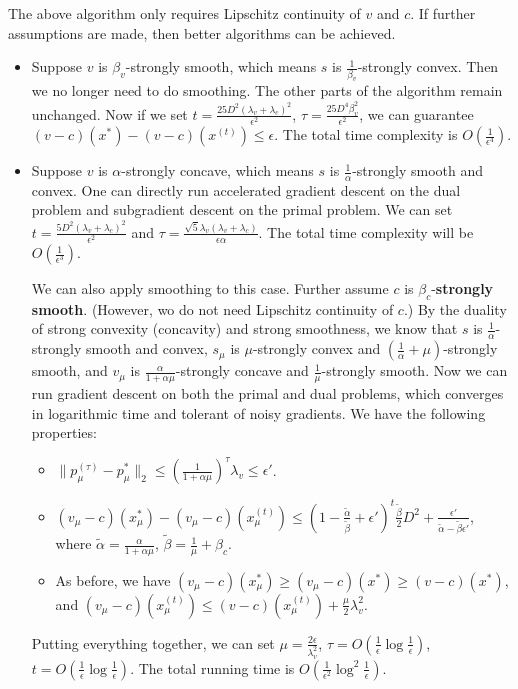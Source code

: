\documentclass{article}
\begin{document}
The above algorithm only requires Lipschitz continuity of $v$ and $c$. If further assumptions are made, then better algorithms can be achieved.
\begin{itemize}
    \item Suppose $v$ is $\beta_v$-strongly smooth, which means $s$ is $\frac{1}{\beta_v}$-strongly convex. Then we no longer need to do smoothing. The other parts of the algorithm remain unchanged. Now if we set $t=\frac{25D^2(\lambda_v+\lambda_c)^2}{\epsilon^2}$, $\tau=\frac{25D^4\beta_v^2}{\epsilon^2}$, we can guarantee $(v-c)(x^*)-(v-c)(x^{(t)})\le\epsilon$. The total time complexity is $O\left(\frac{1}{\epsilon^4}\right)$.
    \item Suppose $v$ is $\alpha$-strongly concave, which means $s$ is $\frac{1}{\alpha}$-strongly smooth and convex. One can directly run accelerated gradient descent on the dual problem and subgradient descent on the primal problem. We can set $t=\frac{5D^2(\lambda_v+\lambda_c)^2}{\epsilon^2}$ and $\tau=\frac{\sqrt{5}\lambda_v(\lambda_v+\lambda_c)}{\epsilon\alpha}$. The total time complexity will be $O\left(\frac{1}{\epsilon^3}\right)$.

    We can also apply smoothing to this case. Further assume $c$ is $\beta_c$-\textbf{strongly smooth}. (However, wo do not need Lipschitz continuity of $c$.) By the duality of strong convexity (concavity) and strong smoothness, we know that $s$ is $\frac{1}{\alpha}$-strongly smooth and convex, $s_{\mu}$ is $\mu$-strongly convex and $(\frac{1}{\alpha}+\mu)$-strongly smooth, and $v_{\mu}$ is $\frac{\alpha}{1+\alpha\mu}$-strongly concave and $\frac{1}{\mu}$-strongly smooth. Now we can run gradient descent on both the primal and dual problems, which converges in logarithmic time and tolerant of noisy gradients. We have the following properties:
    \begin{itemize}
        \item $\|p_{\mu}^{(\tau)}-p_{\mu}^*\|_2\le\left(\frac{1}{1+\alpha\mu}\right)^{\tau}\lambda_v\le\epsilon'$.
        \item $(v_{\mu}-c)(x_{\mu}^*)-(v_{\mu}-c)(x_{\mu}^{(t)})\le(1-\frac{\tilde{\alpha}}{\tilde{\beta}}+\epsilon')^t\frac{\tilde{\beta}}{2}D^2+\frac{\epsilon'}{\tilde{\alpha}-\tilde{\beta}\epsilon'}$,
        where $\tilde{\alpha}=\frac{\alpha}{1+\alpha\mu}$, $\tilde{\beta}=\frac{1}{\mu}+\beta_c$.
        \item As before, we have $(v_{\mu}-c)(x_{\mu}^*)\ge(v_{\mu}-c)(x^*)\ge(v-c)(x^*)$, and $(v_{\mu}-c)(x_{\mu}^{(t)})\le (v-c)(x_{\mu}^{(t)})+\frac{\mu}{2}\lambda_v^2$.
    \end{itemize}
    Putting everything together, we can set $\mu=\frac{2\epsilon}{\lambda_v^2}$, $\tau=O(\frac{1}{\epsilon}\log \frac{1}{\epsilon})$, $t=O(\frac{1}{\epsilon}\log \frac{1}{\epsilon})$. The total running time is $O(\frac{1}{\epsilon^2}\log^2 \frac{1}{\epsilon})$.
\end{itemize}
\end{document}
